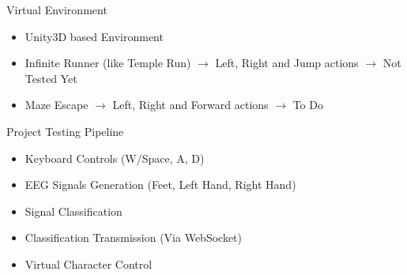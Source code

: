 \begin{frame}{Virtual Environment}
\begin{itemize}
    \item Unity3D based Environment
    \item Infinite Runner (like Temple Run) $\rightarrow{}$ Left, Right and Jump actions $\rightarrow{}$ Not Tested Yet
    \item Maze Escape $\rightarrow{}$ Left, Right and Forward actions $\rightarrow{}$ To Do
\end{itemize}
\end{frame}

\begin{frame}{Project Testing Pipeline}
    \begin{itemize}
        \item Keyboard Controls (W/Space, A, D)
        \item EEG Signals Generation (Feet, Left Hand, Right Hand)
        \item Signal Classification
        \item Classification Transmission (Via WebSocket)
        \item Virtual Character Control
    \end{itemize}
\end{frame}